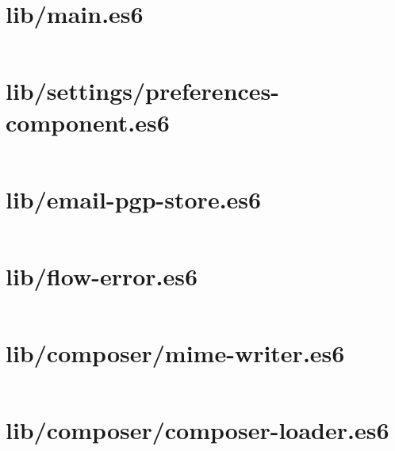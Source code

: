 \documentclass[10pt, letterpaper]{article}
\begin{document}

\setcounter{page}{13}


\section{lib/main.es6}
\inputminted{javascript}{/home/mbilker/.nylas/dev/packages/email-pgp/lib/main.es6}

\section{lib/settings/preferences-component.es6}
\inputminted{javascript}{/home/mbilker/.nylas/dev/packages/email-pgp/lib/settings/preferences-component.es6}

\section{lib/email-pgp-store.es6}
\inputminted{javascript}{/home/mbilker/.nylas/dev/packages/email-pgp/lib/email-pgp-store.es6}


\section{lib/flow-error.es6}
\inputminted{javascript}{/home/mbilker/.nylas/dev/packages/email-pgp/lib/flow-error.es6}

\section{lib/composer/mime-writer.es6}
\inputminted{javascript}{/home/mbilker/.nylas/dev/packages/email-pgp/lib/composer/mime-writer.es6}

\section{lib/composer/composer-loader.es6}
\inputminted{javascript}{/home/mbilker/.nylas/dev/packages/email-pgp/lib/composer/composer-loader.es6}
\end{document}
